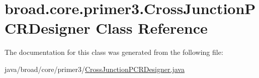 \hypertarget{classbroad_1_1core_1_1primer3_1_1_cross_junction_p_c_r_designer}{\section{broad.\+core.\+primer3.\+Cross\+Junction\+P\+C\+R\+Designer Class Reference}
\label{classbroad_1_1core_1_1primer3_1_1_cross_junction_p_c_r_designer}
}


The documentation for this class was generated from the following file\+:\begin{DoxyCompactItemize}
\item 
java/broad/core/primer3/\hyperlink{_cross_junction_p_c_r_designer_8java}{Cross\+Junction\+P\+C\+R\+Designer.\+java}\end{DoxyCompactItemize}
